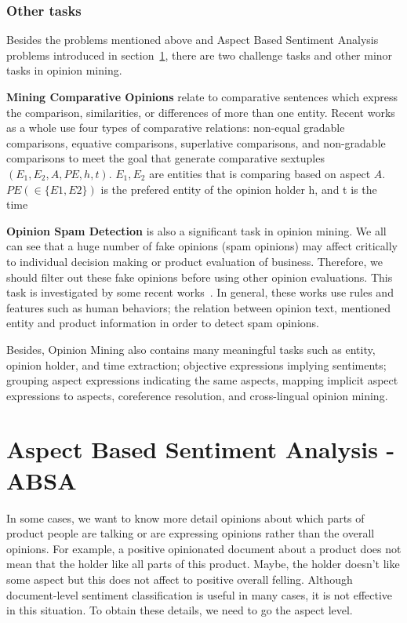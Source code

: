 \documentclass{article}
\begin{document}
\subsubsection{Other tasks}
Besides the problems mentioned above and Aspect Based Sentiment Analysis problems introduced in section~\ref{sec:sbsa}, there are two challenge tasks and other minor tasks in opinion mining.

\textbf{Mining Comparative Opinions} relate to comparative sentences which express the comparison, similarities, or differences of more than one entity.
        Recent works~\cite{Dave:2003:MPG:775152.775226,Ding:2009:EDA:1557019.1557141, Ganapathibhotla:2008:MOC:1599081.1599112,Jindal:2006:MCS:1597348.1597400} as a whole use four types of comparative relations: non-equal gradable comparisons, equative comparisons, superlative comparisons, and non-gradable comparisons to meet the goal that generate comparative sextuples $(E_1, E_2, A, PE, h, t)$.
        $E_1,E_2$ are entities that is comparing based on aspect $A$.
        $PE (\in \{E1, E2\})$ is the prefered entity of the opinion holder h, and t is the time
        
\textbf{Opinion Spam Detection} is also a significant task in opinion mining.
        We all can see that a huge number of fake opinions (spam opinions) may affect critically to individual decision making or product evaluation of business.
        Therefore, we should filter out these fake opinions before using other opinion evaluations.
        This task is investigated by some recent works~\cite{Jindal:2008:OSA:1341531.1341560,Jindal:2007:RSD:1242572.1242759,Lim:2010:DPR:1871437.1871557,Mukherjee:2011:DGR:1963192.1963240}.
        In general, these works use rules and features such as human behaviors; the relation between opinion text, mentioned entity and product information in order to detect spam opinions.
        
Besides, Opinion Mining also contains many meaningful tasks such as entity, opinion holder, and time extraction; objective expressions implying sentiments; grouping aspect expressions indicating the same aspects, mapping implicit aspect expressions to aspects, coreference resolution, and cross-lingual opinion mining.

\section{Aspect Based Sentiment Analysis - ABSA}
\label{sec:sbsa}

In some cases, we want to know more detail opinions about which parts of product people are talking or are expressing opinions rather than the overall opinions.
For example, a positive opinionated document about a product does not mean that the holder like all parts of this product.
Maybe, the holder doesn't like some aspect     but this does not affect to positive overall felling.
Although document-level sentiment classification is useful in many cases, it is not effective in this situation. 
To obtain these details, we need to go the aspect level.
\end{document}
